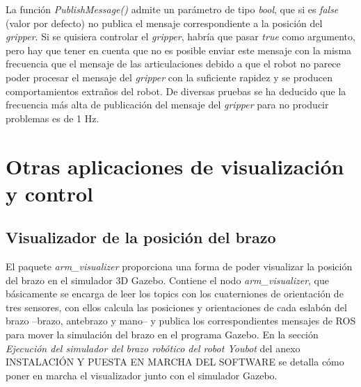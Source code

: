 \documentclass[12pt, a4paper]{report}
\begin{document}
\lstset{inputencoding=utf8/latin1}


La función \textit{PublishMessage()} admite un parámetro de tipo \textit{bool}, que si es \textit{false} (valor por defecto) no publica el mensaje correspondiente a la posición del \textit{gripper}. Si se quisiera controlar el \textit{gripper}, habría que pasar \textit{true} como argumento, pero hay que tener en cuenta que no es posible enviar este mensaje con la misma frecuencia que el mensaje de las articulaciones debido a que el robot no parece poder procesar el mensaje del \textit{gripper} con la suficiente rapidez y se producen comportamientos extraños del robot. De diversas pruebas se ha deducido que la frecuencia más alta de publicación del mensaje del \textit{gripper} para no producir problemas es de 1 Hz.

\section{Otras aplicaciones de visualización y control}

\subsection{Visualizador de la posición del brazo}

El paquete \textit{arm\_visualizer} proporciona una forma de poder visualizar la posición del brazo en el simulador 3D Gazebo. Contiene el nodo \textit{arm\_visualizer}, que básicamente se encarga de leer los topics con los cuaterniones de orientación de tres sensores, con ellos calcula las posiciones y orientaciones de cada eslabón del brazo --brazo, antebrazo y mano-- y publica los correspondientes mensajes de ROS para mover la simulación del brazo en el programa Gazebo. En la sección \textit{Ejecución del simulador del brazo robótico del robot Youbot} del anexo INSTALACIÓN Y PUESTA EN MARCHA DEL SOFTWARE se detalla cómo poner en marcha el visualizador junto con el simulador Gazebo.
\end{document}
